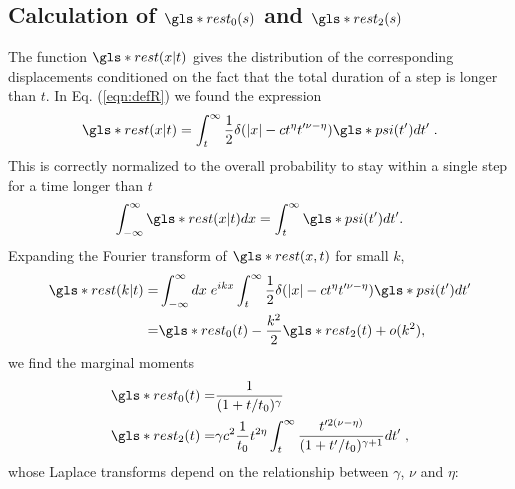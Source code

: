 \subsection*{Calculation of  $\gls*{rest}_0(s)$ and $\gls*{rest}_2(s)$}
The function $\gls*{rest}(x|t)$ gives the distribution of
the corresponding displacements conditioned on the fact that the total duration of a step is longer than $t$. In Eq. (\ref{eqn:defR}) we found the expression
%
\begin{equation}
 \gls*{rest}(x|t) =  \int_t^\infty \frac{1}{2} \delta(|x| - c t^{\eta}t'^{\nu-\eta}) \gls*{psi}(t') dt' \; .
\end{equation}
This is correctly normalized to the overall probability to stay within a single step for a time longer than $t$ 
\begin{equation}
 \int_{-\infty}^{\infty} \gls*{rest}(x|t)  dx = \int_t^\infty \gls*{psi}(t') dt'.
\end{equation}
Expanding the Fourier transform of $\gls*{rest}(x,t)$ for small $k$,
\begin{align}
\gls*{rest}(k|t) =& \int_{-\infty}^{\infty} dx \; e^{ikx} \int_t^\infty \frac{1}{2} \delta(|x| - c t^{\eta}t'^{\nu-\eta}) \gls*{psi}(t') dt' \nonumber \\
=& \gls*{rest}_0(t) - \frac{k^2}{2} \gls*{rest}_2(t) + o(k^2), 
\end{align}
we find the marginal moments
\begin{align}
\gls*{rest}_0(t) =& \frac{1}{(1+t/t_0)^{\gamma}} \\
\gls*{rest}_2(t) =& \gamma c^2 \frac{1 }{t_0} t^{2\eta} \int_t^\infty \frac{t'^{2(\nu-\eta)}}{(1+t'/t_0)^{\gamma+1}} dt' \; , 
\end{align}
whose Laplace transforms depend on the relationship between $\gamma$, $\nu$ and $\eta$: 

